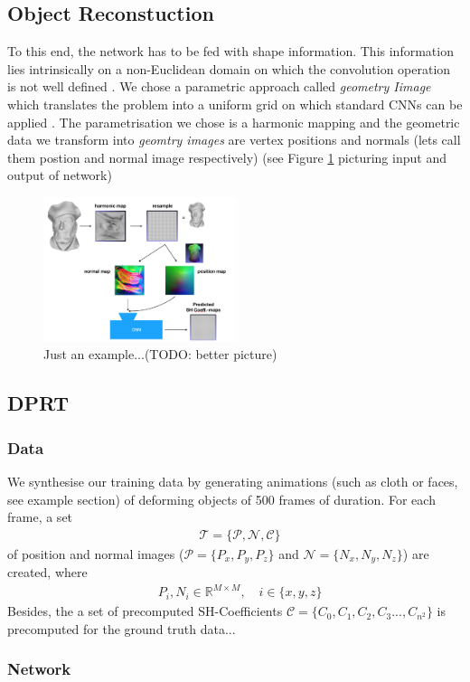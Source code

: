 \subsection{Object Reconstuction}
To this end, the network has to be fed with shape information. This information lies intrinsically on a non-Euclidean domain on which the convolution operation is not well defined \cite{Masci2015ShapeNetCN, Geometric_deep_learning, CNN_on_Torus}. We chose a parametric approach called \textit{geometry Iimage } which translates the problem into a uniform grid on which standard CNNs can be applied \cite{gu2002geometry, sinha2016deep}. The parametrisation we chose is a harmonic mapping and the geometric data we transform into \textit{geomtry images} are vertex positions and normals (lets call them postion and normal image respectively)  (see Figure \ref{Fig: Method_Overview} picturing input and output of network)
\begin{figure}[H]
  \centering
    \includegraphics[width=0.5\textwidth]{Figures/Overview_method}
     \caption{Just an example...(TODO: better picture)}
     \label{Fig: Method_Overview}
\end{figure}
\subsection{DPRT}
\subsubsection{Data}
We synthesise our training data by generating animations (such as cloth or faces, see example section) of deforming objects of 500 frames of duration. For each frame, a set
\begin{align*}
&\mathcal{T} = \{  \mathcal{P} , \mathcal{N} , \mathcal{C}\} 
\end{align*}
of position and normal images ($\mathcal{P}= \{ P_x , P_y, P_z \} $  and $\mathcal{N}= \{ N_x , N_y, N_z \} $) are created, where 
\begin{align*}
&P_i,N_i \in \mathbb{R}^{M \times M} ,
\quad
i \in \{x,y,z\}
\end{align*}
Besides, the a set of precomputed SH-Coefficients $\mathcal{C}= \{ C_0 , C_1, C_2, C_3..., C_{n^2} \} $ is precomputed for the ground truth data...
\subsubsection{Network}



